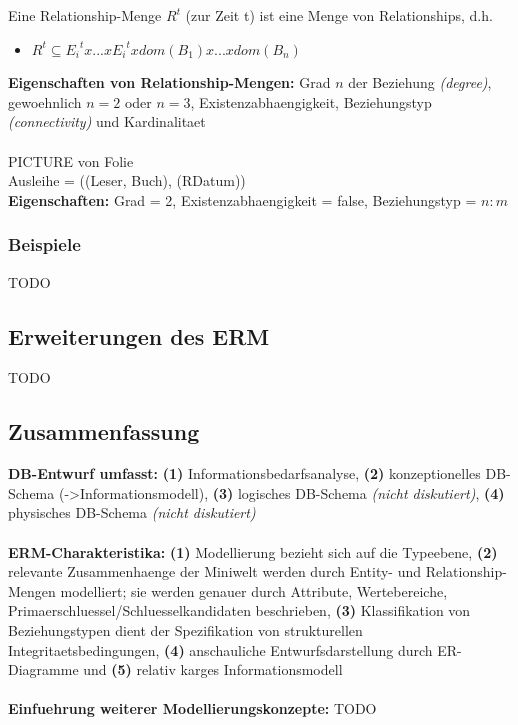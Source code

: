 \documentclass[a4paper,10pt]{article}
\begin{document}
Eine Relationship-Menge $R^t$ (zur Zeit t) ist eine Menge von Relationships, d.h.
\begin{itemize}
\item $R^t \subseteq {E_i}^t x ... x {E_i}^t x dom(B_1) x ... x dom(B_n)$
\end{itemize}

\textbf{Eigenschaften von Relationship-Mengen:}
Grad $n$ der Beziehung \emph{(degree)}, gewoehnlich $n = 2$ oder $n = 3$, Existenzabhaengigkeit, Beziehungstyp \emph{(connectivity)} und Kardinalitaet
\\~\\
PICTURE von Folie
\\
Ausleihe = ((Leser, Buch), (RDatum))\\
\textbf{Eigenschaften:} Grad = 2, Existenzabhaengigkeit = false, Beziehungstyp = $n:m$

\subsubsection{Beispiele}
TODO

\subsection{Erweiterungen des ERM}
TODO

\subsection{Zusammenfassung}
\textbf{DB-Entwurf umfasst:} \textbf{(1)} Informationsbedarfsanalyse, \textbf{(2)} konzeptionelles DB-Schema (-\textgreater Informationsmodell), \textbf{(3)} logisches DB-Schema \emph{(nicht diskutiert)}, \textbf{(4)} physisches DB-Schema \emph{(nicht diskutiert)}
\\~\\
\textbf{ERM-Charakteristika:} \textbf{(1)} Modellierung bezieht sich auf die Typeebene, \textbf{(2)} relevante Zusammenhaenge der Miniwelt werden durch Entity- und Relationship-Mengen modelliert; sie werden genauer durch Attribute, Wertebereiche, Primaerschluessel/Schluesselkandidaten beschrieben, \textbf{(3)} Klassifikation von Beziehungstypen dient der Spezifikation von strukturellen Integritaetsbedingungen, \textbf{(4)} anschauliche Entwurfsdarstellung durch ER-Diagramme und \textbf{(5)} relativ karges Informationsmodell
\\~\\
\textbf{Einfuehrung weiterer Modellierungskonzepte:} TODO
\end{document}
